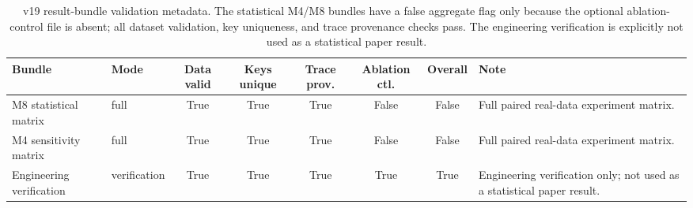 


\begin{table}[t]
\centering
\caption{v19 result-bundle validation metadata. The statistical M4/M8 bundles have a false aggregate flag only because the optional ablation-control file is absent; all dataset validation, key uniqueness, and trace provenance checks pass. The engineering verification is explicitly not used as a statistical paper result.}
\label{tab:validation}

\scriptsize
\setlength{\tabcolsep}{3pt}
\renewcommand{\arraystretch}{1.08}

\begin{adjustbox}{max width=\textwidth}
\begin{tabular}{llccccc p{7.0cm}}
\toprule
Bundle
& Mode
& Data valid
& Keys unique
& Trace prov.
& Ablation ctl.
& Overall
& Note \\
\midrule

M8 statistical matrix
& full
& True
& True
& True
& False
& False
& Full paired real-data experiment matrix. \\

M4 sensitivity matrix
& full
& True
& True
& True
& False
& False
& Full paired real-data experiment matrix. \\

Engineering verification
& verification
& True
& True
& True
& True
& True
& Engineering verification only; not used as a statistical paper result. \\

\bottomrule
\end{tabular}
\end{adjustbox}
\end{table}